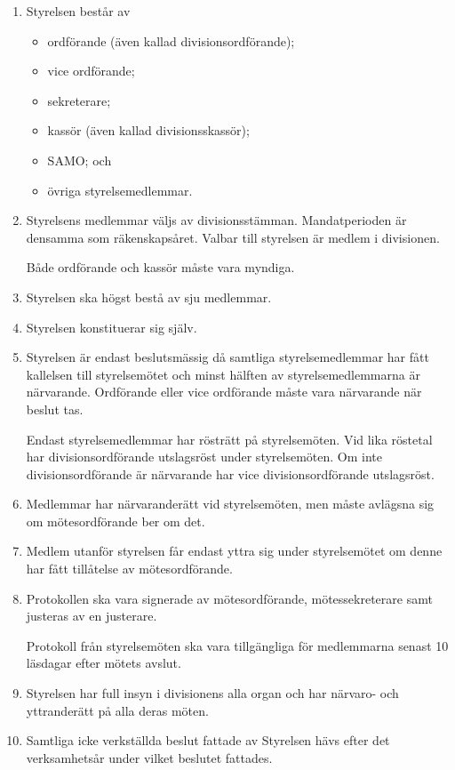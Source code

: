 \documentclass{dvd}
\begin{document}
	\begin{enumerate}[label=\arabic* §, ref=\arabic*]
		\item Styrelsen består av

		\begin{itemize}
			\item ordförande (även kallad divisionsordförande);

			\item vice ordförande;

			\item sekreterare;

			\item kassör (även kallad divisionsskassör);

			\item SAMO; och

			\item övriga styrelsemedlemmar.
		\end{itemize}

		\item Styrelsens medlemmar väljs av divisionsstämman.
		Mandatperioden är densamma som räkenskapsåret.
		Valbar till styrelsen är medlem i divisionen.

		Både ordförande och kassör måste vara myndiga.

		\item Styrelsen ska högst bestå av sju medlemmar.

		\item Styrelsen konstituerar sig själv.

		\item Styrelsen är endast beslutsmässig då samtliga styrelsemedlemmar har fått kallelsen till styrelsemötet och minst hälften av styrelsemedlemmarna är närvarande.
		Ordförande eller vice ordförande måste vara närvarande när beslut tas.
		
		Endast styrelsemedlemmar har rösträtt på styrelsemöten.
		Vid lika röstetal har divisionsordförande utslagsröst under styrelsemöten.
		Om inte divisionsordförande är närvarande har vice divisionsordförande utslagsröst.

		\item Medlemmar har närvaranderätt vid styrelsemöten, men måste avlägsna sig om mötesordförande ber om det.

		\item Medlem utanför styrelsen får endast yttra sig under styrelsemötet om denne har fått tillåtelse av mötesordförande.

		\item Protokollen ska vara signerade av mötesordförande, mötessekreterare samt justeras av en justerare.

		Protokoll från styrelsemöten ska vara tillgängliga för medlemmarna senast 10 läsdagar efter mötets avslut.

		\item Styrelsen har full insyn i divisionens alla organ och har närvaro- och yttranderätt på alla deras möten.

                \item Samtliga icke verkställda beslut fattade av Styrelsen hävs efter det verksamhetsår under vilket beslutet fattades.
	\end{enumerate}
\end{document}
